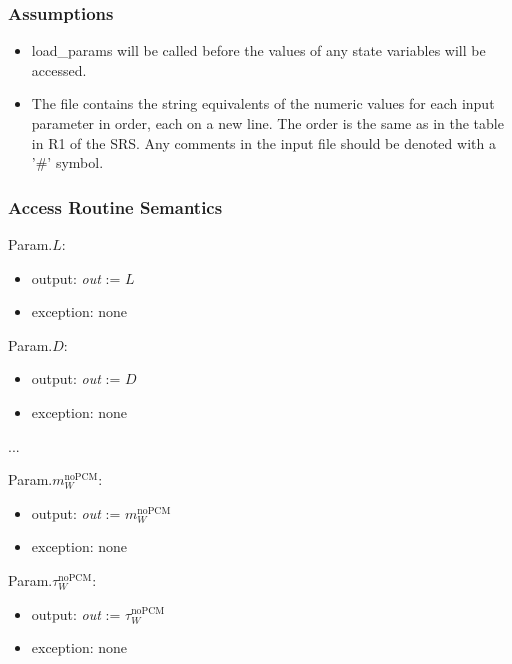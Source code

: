 \documentclass[12pt]{article}
\begin{document}
\subsubsection{Assumptions}

\begin{itemize}

\item load\_params will be called before the values of any state variables will be accessed.

\item The file contains the string equivalents of the numeric values for
each input parameter in order, each on a new line. The order is the same as in
the table in R1 of the SRS. Any comments in the input file should be denoted
with a '\#' symbol.

\end{itemize}

\subsubsection{Access Routine Semantics}

\noindent Param.$L$:
\begin{itemize}
\item output: \textit{out} := $L$
\item exception: none
\end{itemize}

\noindent Param.$D$:
\begin{itemize}
\item output: \textit{out} := $D$
\item exception: none
\end{itemize}

...
~\newline

\noindent Param.$m_W^{\text{noPCM}}$:
\begin{itemize}
\item output: \textit{out} := $m_W^{\text{noPCM}}$
\item exception: none
\end{itemize}

\noindent Param.$\tau_W^{\text{noPCM}}$:
\begin{itemize}
\item output: \textit{out} := $\tau_W^{\text{noPCM}}$
\item exception: none
\end{itemize}
\end{document}
